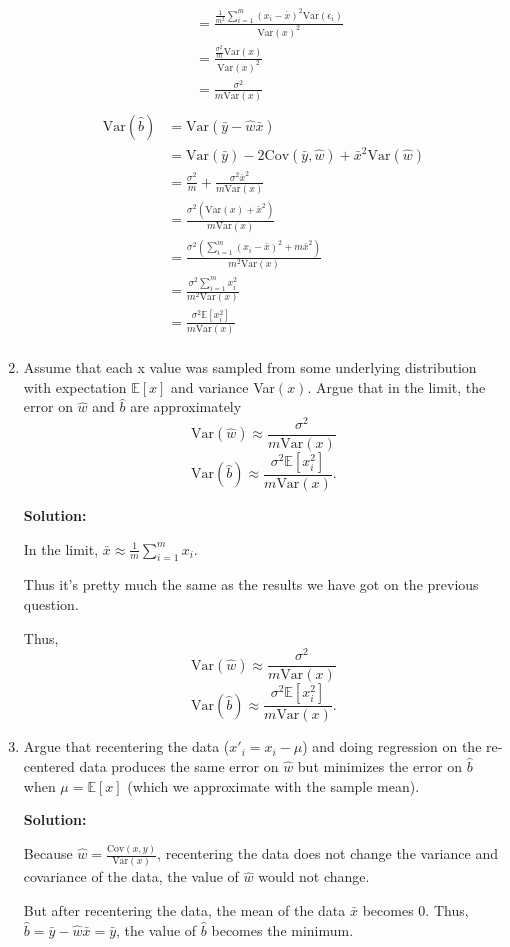 \documentclass[letter, 12pt]{article}
\begin{document}
\begin{enumerate}
\begin{align*}
    		&= \frac{\frac{1}{m^2}\sum_{i=1}^{m} (x_i - \bar{x})^2\text{Var}(\epsilon_i)}{\text{Var}(x)^2} \\
    		&= \frac{\frac{\sigma^2}{m}\text{Var}(x)}{\text{Var}(x)^2} \\
    		&= \frac{\sigma^2}{m\text{Var}(x)} \\
    	\end{align*}
    	\begin{align*}
	    	\text{Var}(\hat{b}) &= \text{Var}(\bar{y} - \hat{w}\bar{x}) \\
	    	&= \text{Var}(\bar{y}) - 2\text{Cov}(\bar{y}, \hat{w}) + \bar{x}^2\text{Var}(\hat{w}) \\
	    	&= \frac{\sigma^2}{m} + \frac{\sigma^2\bar{x}^2}{m\text{Var}(x)} \\
	    	&= \frac{\sigma^2(\text{Var}(x) + \bar{x}^2)}{m\text{Var}(x)} \\
	    	&= \frac{\sigma^2(\sum_{i=1}^{m}(x_i - \bar{x})^2 + m\bar{x}^2)}{m^2\text{Var}(x)} \\
	    	&= \frac{\sigma^2\sum_{i=1}^{m}x_i^2}{m^2\text{Var}(x)} \\
	    	&= \frac{\sigma^2 \mathbb{E}[x_i^2]}{m\text{Var}(x)} \\
    	\end{align*}
    	
    	\item{Assume that each x value was sampled from some underlying distribution with expectation $ \mathbb{E}[x] $ and variance Var$ (x) $. Argue that in the limit, the error on $ \hat{w} $ and $ \hat{b} $ are approximately 
    		\[ \text{Var}(\hat{w}) \approx \frac{\sigma^2}{m\text{Var}(x)} \]
    		\[ \text{Var}(\hat{b}) \approx \frac{\sigma^2 \mathbb{E}[x_i^2]}{m\text{Var}(x)} .\]
    	}
    	\par{\textbf{Solution:}}
    	\par{In the limit, $ \bar{x} \approx \frac{1}{m} \sum_{i=1}^{m} x_i $.}
    	\par{Thus it's pretty much the same as the results we have got on the previous question.}
    	\par{Thus, \[ \text{Var}(\hat{w}) \approx \frac{\sigma^2}{m\text{Var}(x)} \]
    		\[ \text{Var}(\hat{b}) \approx \frac{\sigma^2 \mathbb{E}[x_i^2]}{m\text{Var}(x)} .\]}
    	
    	\item{Argue that recentering the data ($ x'_i = x_i - \mu $) and doing regression on the re-centered data produces the
    		same error on $ \hat{w} $ but minimizes the error on $ \hat{b} $ when $ \mu = \mathbb{E}[x] $ (which we approximate with the sample
    		mean).}
    	\par{\textbf{Solution:}}
    	\par{Because $ \hat{w} = \frac{\text{Cov}(x, y)}{\text{Var}(x)}$, recentering the data does not change the variance and covariance of the data, the value of $ \hat{w} $ would not change. }
    	\par{But after recentering the data, the mean of the data $ \bar{x} $ becomes 0. Thus, $ \hat{b} = \bar{y} - \hat{w} \bar{x} = \bar{y}$, the value of $ \hat{b} $ becomes the minimum.}
    	

\end{enumerate}
\end{document}
